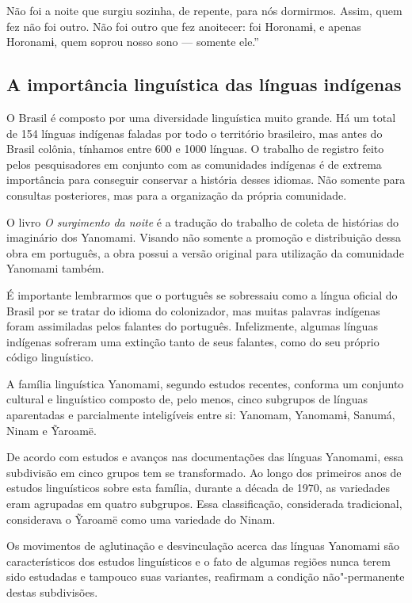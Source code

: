 \documentclass[12pt]{extarticle}
\begin{document}
Não foi a noite que surgiu sozinha, de repente, para nós dormirmos. Assim, quem fez 
não foi outro. Não foi outro que fez anoitecer: foi Horonamɨ, e apenas Horonamɨ, quem 
soprou nosso sono — somente ele.''


\subsection{A importância linguística das línguas indígenas}

O Brasil é composto por uma diversidade linguística muito grande. Há um
total de 154 línguas indígenas faladas por todo o território brasileiro,
mas antes do Brasil colônia, tínhamos entre 600 e 1000 línguas. O
trabalho de registro feito pelos pesquisadores em conjunto com as
comunidades indígenas é de extrema importância para conseguir conservar
a história desses idiomas. Não somente para consultas posteriores, mas
para a organização da própria comunidade.

O livro \emph{O surgimento da noite} é a tradução do trabalho de coleta
de histórias do imaginário dos Yanomami. Visando não somente a promoção
e distribuição dessa obra em português, a obra possui a versão original
para utilização da comunidade Yanomami também.


É importante lembrarmos que o português se sobressaiu como a língua
oficial do Brasil por se tratar do idioma do colonizador, mas muitas
palavras indígenas foram assimiladas pelos falantes do português.
Infelizmente, algumas línguas indígenas sofreram uma extinção tanto de
seus falantes, como do seu próprio código linguístico.

A família linguística Yanomami, segundo estudos recentes, conforma um 
conjunto cultural e linguístico composto de, pelo menos, cinco subgrupos 
de línguas aparentadas e parcialmente inteligíveis entre si: Yanomam, 
Yanomamɨ, Sanumá, Ninam e Ỹaroamë. 

De acordo com estudos e avanços nas documentações das línguas Yanomami, essa
subdivisão em cinco grupos tem se transformado. Ao longo dos primeiros anos 
de estudos linguísticos sobre esta família, durante a década de 1970, as variedades 
eram agrupadas em quatro subgrupos. Essa classificação, considerada tradicional,
considerava o Ỹaroamë como uma variedade do Ninam. 

Os movimentos de aglutinação e desvinculação acerca das línguas Yanomami são 
característicos dos estudos linguísticos e o fato de algumas regiões nunca terem 
sido estudadas e tampouco suas variantes, reafirmam a condição não"-permanente 
destas subdivisões. 
\end{document}
